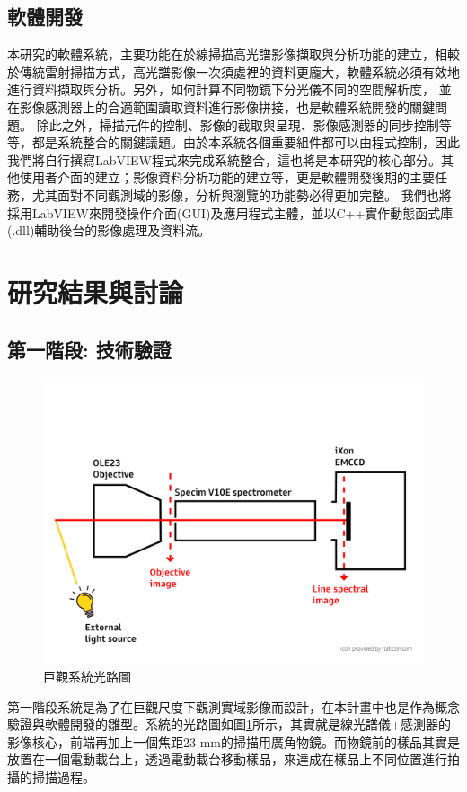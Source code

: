 \documentclass[12pt]{article}
\begin{document}
\subsection{軟體開發} \label{software}
本研究的軟體系統，主要功能在於線掃描高光譜影像擷取與分析功能的建立，相較於傳統雷射掃描方式，高光譜影像一次須處裡的資料更龐大，軟體系統必須有效地進行資料擷取與分析。另外，如何計算不同物鏡下分光儀不同的空間解析度，
並在影像感測器上的合適範圍讀取資料進行影像拼接，也是軟體系統開發的關鍵問題。
除此之外，掃描元件的控制、影像的截取與呈現、影像感測器的同步控制等等，都是系統整合的關鍵議題。由於本系統各個重要組件都可以由程式控制，因此我們將自行撰寫LabVIEW程式來完成系統整合，這也將是本研究的核心部分。其他使用者介面的建立；影像資料分析功能的建立等，更是軟體開發後期的主要任務，尤其面對不同觀測域的影像，分析與瀏覽的功能勢必得更加完整。
我們也將採用LabVIEW來開發操作介面(GUI)及應用程式主體，並以C++實作動態函式庫(.dll)輔助後台的影像處理及資料流。

\section{研究結果與討論}
\subsection{第一階段: 技術驗證}
\begin{figure}
    \centering
    \includegraphics[width = 0.9\linewidth]{lightPath.jpg}
    \caption{巨觀系統光路圖}
    \label{fig: macro path}
\end{figure}
第一階段系統是為了在巨觀尺度下觀測實域影像而設計，在本計畫中也是作為概念驗證與軟體開發的雛型。系統的光路圖如圖\ref{fig: macro path}所示，其實就是線光譜儀+感測器的影像核心，前端再加上一個焦距23 mm的掃描用廣角物鏡。而物鏡前的樣品其實是放置在一個電動載台上，透過電動載台移動樣品，來達成在樣品上不同位置進行拍攝的掃描過程。
\end{document}
